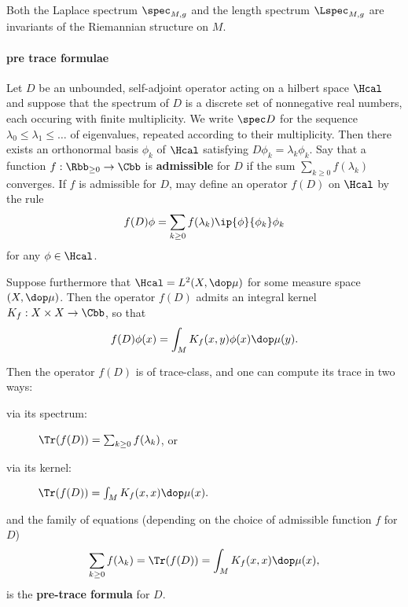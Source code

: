 \begin{remark}\label{remark:metricInvariants}
    Both the Laplace spectrum $\spec_{M,g}$ and the length spectrum $\Lspec_{M,g}$ are invariants of the Riemannian structure on $M$.
\end{remark}

\paragraph{pre trace formulae}
Let $D$ be an unbounded, self-adjoint operator acting on a hilbert space $\Hcal$ and suppose that the spectrum of $D$ is a discrete set of nonnegative real numbers, each occuring with finite multiplicity. We write $\spec D$ for the sequence $\lambda_0 \leq \lambda_1 \leq \dots$ of eigenvalues, repeated according to their multiplicity. Then there exists an orthonormal basis $\phi_k$ of $\Hcal$ satisfying $D \phi_k = \lambda_k \phi_k$. Say that a function $f: \Rbb_{\geq 0} \to \Cbb$ is \textbf{admissible} for $D$ if the sum $\sum_{k\geq 0}f(\lambda_k)$ converges.  If $f$ is admissible for $D$, may define an operator $f(D)$ on $\Hcal$ by the rule
\begin{align} \label{eq:spectrum}
    f(D) \phi = \sum_{k\geq 0} f(\lambda_k) \ip {\phi}{\phi_k} \phi_k
\end{align}
for any $\phi\in \Hcal$.

Suppose furthermore that $\Hcal = L^2(X,\dop \mu)$ for some measure space $(X,\dop \mu)$. Then the operator $f(D)$ admits an integral kernel $K_f : X\times X \to \Cbb$, so that
\begin{align}\label{eq:kernel}
    f(D) \phi(x) = \int_M K_f(x,y)\phi(x) \dop \mu(y).
\end{align}

Then the operator $f(D)$ is of trace-class, and one can compute its trace in two ways:
\begin{description}
    \item[via its spectrum:] $ \Tr(f(D)) = \sum_{k\geq 0} f(\lambda_k)$, or
    \item[via its kernel:] $\Tr(f(D)) = \int_{M} K_f(x,x) \dop \mu(x).$
\end{description}
and the family of equations (depending on the choice of admissible function $f$ for $D$)
\begin{align}
    \sum_{k\geq 0} f(\lambda_k) = \Tr(f(D)) = \int_{M} K_f(x,x) \dop \mu(x),
\end{align}
is the \textbf{pre-trace formula} for $D$.

